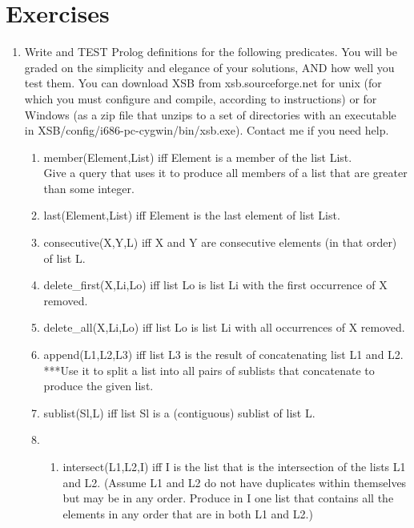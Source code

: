 \section{Exercises}

\begin{enumerate}
\item
Write and TEST Prolog definitions for the following predicates. You
will be graded on the simplicity and elegance of your solutions, AND
how well you test them.  You can download XSB from
xsb.sourceforge.net for unix (for which you must configure and
compile, according to instructions) or for Windows (as a zip file that
unzips to a set of directories with an executable in
XSB/config/i686-pc-cygwin/bin/xsb.exe).  Contact me if you need help.

\begin{enumerate}
\item
member(Element,List) iff Element is a member of the list List. \\
Give a query that uses it to produce all members of a list that are
greater than some integer.

\item
last(Element,List) iff Element is the last element of list List.

\item

consecutive(X,Y,L) iff X and Y are consecutive elements (in that order) of list L.

\item
delete\_first(X,Li,Lo) iff list Lo is list Li with the first
occurrence of X removed.

\item
delete\_all(X,Li,Lo) iff list Lo is list Li with all occurrences of X
removed.

\item
append(L1,L2,L3) iff list L3 is the result of concatenating list L1
and L2. ***Use it to split a list into all pairs of sublists that
concatenate to produce the given list.

\item
sublist(Sl,L) iff list Sl is a (contiguous) sublist of list L.

\item
\begin{enumerate}
\item
intersect(L1,L2,I) iff I is the list that is the intersection of the
lists L1 and L2. (Assume L1 and L2 do not have duplicates within
themselves but may be in any order.  Produce in I one list that
contains all the elements in any order that are in both L1 and L2.)


\end{enumerate}
\end{enumerate}
\end{enumerate}
